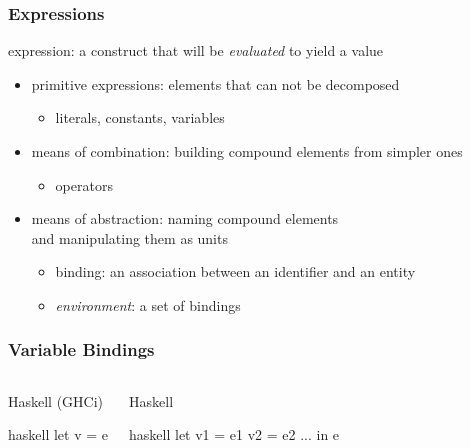 \documentclass[dvipsnames]{beamer}
\theoremstyle{plain}
\begin{document}
\begin{frame}
  \frametitle{Expressions}

  \begin{definition}
    \alert{expression}: a construct that will be \emph{evaluated} to yield a value
  \end{definition}

  \pause
  \medskip
  \begin{itemize}
    \item primitive expressions: elements that can not be decomposed\\
    \begin{itemize}
      \item literals, constants, variables
    \end{itemize}
    \item means of combination: building compound elements from simpler ones\\
    \begin{itemize}
      \item operators
    \end{itemize}
    \item means of abstraction: naming compound elements\\
      and manipulating them as units
    \begin{itemize}
      \item \alert{binding}: an association between an identifier and an entity
      \item \emph{environment}: a set of bindings
    \end{itemize}
  \end{itemize}
\end{frame}

\begin{frame}[fragile]
  \frametitle{Variable Bindings}

  \begin{columns}[t]
    \begin{block}{Haskell (GHCi)}
      \begin{pygments}{haskell}
let v = e
      \end{pygments}
    \end{block}

    \pause
    \begin{block}{Haskell}
      \begin{pygments}{haskell}
let
  v1 = e1
  v2 = e2
  ...
in
  e
      \end{pygments}
    \end{block}
  \end{columns}
\end{frame}
\end{document}
